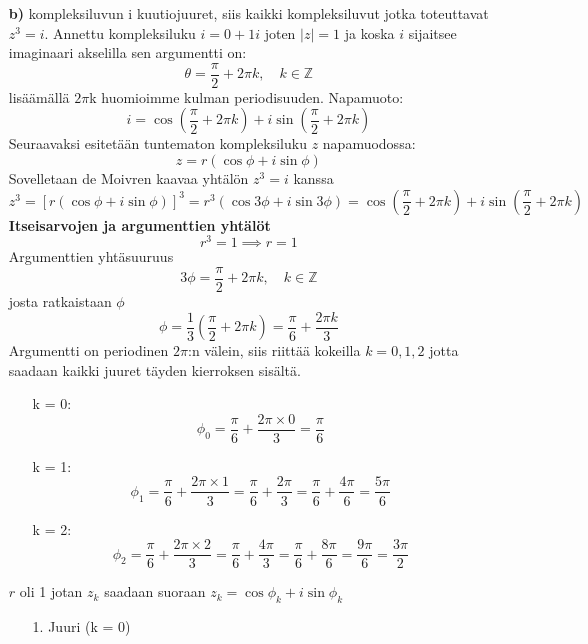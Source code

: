 \documentclass{article}
\begin{document}
\begin{itemize}
    \newpage    
        
    \item[\textbf{b)}]kompleksiluvun i kuutiojuuret, siis kaikki kompleksiluvut jotka toteuttavat $z^3 = i$. \newline
    Annettu kompleksiluku $i = 0 + 1i$ joten $|z| = 1$ ja koska $i$ sijaitsee imaginaari akselilla sen argumentti on:
    \[
    \theta = \frac{\pi}{2} + 2\pi k, \quad k \in \mathbb{Z}
    \]
    lisäämällä $2\pi$k  huomioimme kulman periodisuuden.\newline
    Napamuoto:
    \[
        i = \cos\left( \frac{\pi}{2} + 2\pi k \right) + i \sin\left( \frac{\pi}{2} + 2\pi k \right)
    \]
    Seuraavaksi esitetään tuntematon kompleksiluku $z$ napamuodossa:
    \[
    z = r \left( \cos \phi + i \sin \phi \right)
    \]
    Sovelletaan de Moivren kaavaa yhtälön $z^3 = i$ kanssa
    \[
    z^3 = \left[ r \left( \cos \phi + i \sin \phi \right) \right]^3 = r^3 \left( \cos 3\phi + i \sin 3\phi \right) = \cos\left( \frac{\pi}{2} + 2\pi k \right) + i \sin\left( \frac{\pi}{2} + 2\pi k \right)
    \]
    \textbf{Itseisarvojen ja argumenttien yhtälöt}
    \[
    r^3 = 1 \implies r = 1
    \]
    Argumenttien yhtäsuuruus
    \[
    3\phi = \frac{\pi}{2} + 2\pi k, \quad k \in \mathbb{Z}
    \]
    josta ratkaistaan $\phi$
    \[
    \phi = \frac{1}{3} \left( \frac{\pi}{2} + 2\pi k \right) = \frac{\pi}{6} + \frac{2\pi k}{3}
    \]
    Argumentti on periodinen $2\pi$:n välein, siis riittää kokeilla $k = 0, 1, 2$ jotta saadaan kaikki juuret täyden kierroksen sisältä.
    \begin{itemize}
        \item[k = 0:]
        \[
        \phi_0 = \frac{\pi}{6} + \frac{2\pi \times 0}{3} = \frac{\pi}{6}
        \]
        \item[k = 1:]
        \[
        \phi_1 = \frac{\pi}{6} + \frac{2\pi \times 1}{3} = \frac{\pi}{6} + \frac{2\pi}{3} = \frac{\pi}{6} + \frac{4\pi}{6} = \frac{5\pi}{6}
        \]
        \item[k = 2:]
        \[
        \phi_2 = \frac{\pi}{6} + \frac{2\pi \times 2}{3} = \frac{\pi}{6} + \frac{4\pi}{3} = \frac{\pi}{6} + \frac{8\pi}{6} = \frac{9\pi}{6} = \frac{3\pi}{2}
        \]
    \end{itemize}
\newpage
    $r$ oli 1 jotan $z_k$ saadaan suoraan $z_k = \cos \phi_k + i \sin \phi_k$
    \begin{itemize}
        \item [1.] Juuri (k = 0)
        \[
        \begin{aligned}

\end{aligned}\]
\end{itemize}
\end{itemize}
\end{document}
